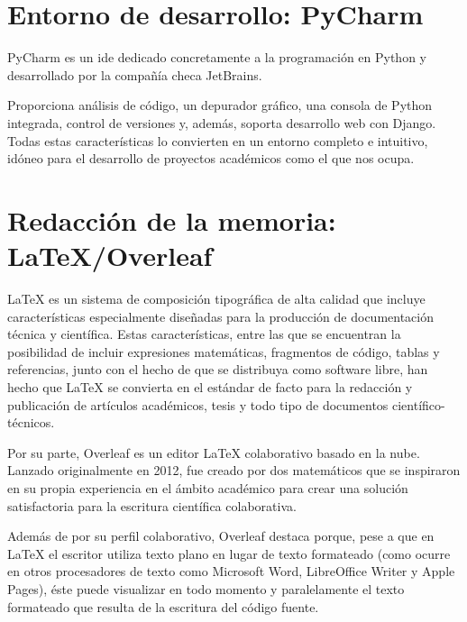 \documentclass[a4paper, 12pt]{book}
\begin{document}
\section{Entorno de desarrollo: PyCharm}
\label{sec:entorno_de_desarrollo}


PyCharm es un \gls{ide} dedicado concretamente a la programación en Python y desarrollado por la compañía checa JetBrains.

Proporciona análisis de código, un depurador gráfico, una consola de Python integrada, control de versiones y, además, soporta desarrollo web con Django. Todas estas características lo convierten en un entorno completo e intuitivo, idóneo para el desarrollo de proyectos académicos como el que nos ocupa.


\section{Redacción de la memoria: LaTeX/Overleaf}
\label{sec:redaccion_de_la_memoria}

LaTeX es un sistema de composición tipográfica de alta calidad que incluye características especialmente diseñadas para la producción de documentación técnica y científica. Estas características, entre las que se encuentran la posibilidad de incluir expresiones matemáticas, fragmentos de código, tablas y referencias, junto con el hecho de que se distribuya como software libre, han hecho que LaTeX se convierta en el estándar de facto para la redacción y publicación de artículos académicos, tesis y todo tipo de documentos científico-técnicos. 

Por su parte, Overleaf es un editor LaTeX colaborativo basado en la nube. Lanzado originalmente en 2012, fue creado por dos matemáticos que se inspiraron en su propia experiencia en el ámbito académico para crear una solución satisfactoria para la escritura científica colaborativa.

Además de por su perfil colaborativo, Overleaf destaca porque, pese a que en LaTeX el escritor utiliza texto plano en lugar de texto formateado (como ocurre en otros procesadores de texto como Microsoft Word, LibreOffice Writer y Apple Pages), éste puede visualizar en todo momento y paralelamente el texto formateado que resulta de la escritura del código fuente.
\end{document}
